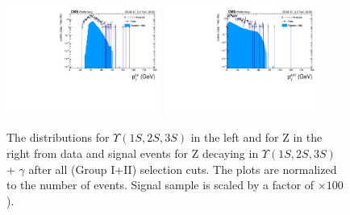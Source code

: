 \begin{figure}[!htbp]
\begin{center}
\includegraphics[width=0.45\textwidth]{figures/outputPlots/ZtoUpsilon_Cat0_ZZZZZ/nEvts/data_x_mc/withKinCuts/h_withKin_Upsilon_Pt}\hspace*{1.cm}
\includegraphics[width=0.45\textwidth]{figures/outputPlots/ZtoUpsilon_Cat0_ZZZZZ/nEvts/data_x_mc/withKinCuts/h_withKin_Z_Pt}
\end{center}\vspace*{-.5cm}
\caption{The \PT distributions for $\Upsilon(1S,2S,3S)$ in the left and for Z in the right from data and signal events for Z decaying in $\Upsilon(1S,2S,3S)$ + $\gamma$ after all (Group I+II) selection cuts. The plots are normalized to the number of events. Signal sample is scaled by a factor of $\times 100$).}
\label{fig:pTUpsilon_and_Z_ZtoUpsilon_Cat0_groupI_plus_II}
\end{figure}


